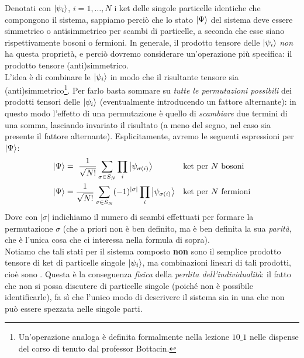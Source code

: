 \documentclass[../../FisicaTeorica.tex]{subfiles}
\begin{document}
Denotati con $\Ket{\psi_i}$, $i=1, \dots, N$ i ket delle singole particelle identiche che compongono il sistema, sappiamo perciò che lo stato  $\Ket{\Psi}$ del sistema deve essere simmetrico o antisimmetrico per scambi di particelle, a seconda che esse siano rispettivamente bosoni o fermioni. In generale, il prodotto tensore delle $\Ket{\psi_i}$ \textit{non} ha questa proprietà, e perciò dovremo considerare un'operazione più specifica: il prodotto tensore (anti)simmetrico.\\
L'idea è di combinare le $\Ket{\psi_i}$ in modo che il risultante tensore sia (anti)simmetrico\footnote{Un'operazione analoga è definita formalmente nella lezione $10\_1$ nelle dispense del corso di  tenuto dal professor Bottacin.}. Per farlo basta sommare su \textit{tutte le permutazioni possibili} dei prodotti tensori delle $\Ket{\psi_i}$ (eventualmente introducendo un fattore alternante): in questo modo l'effetto di una permutazione è quello di \textit{scambiare} due termini di una somma, lasciando invariato il risultato (a meno del segno, nel caso sia presente il fattore alternante). Esplicitamente, avremo le seguenti espressioni per $\Ket{\Psi}$:
\begin{align*}
\Ket{\Psi} &=\ \frac{1}{\sqrt{N!}}\sum_{\sigma \in S_N} \prod_i \Ket{\psi_{\sigma(i)}} && \text{ket per $N$ bosoni}\\
\Ket{\Psi} &= \frac{1}{\sqrt{N!}}\sum_{\sigma \in S_N} (-1)^{|\sigma|}\prod_i \Ket{\psi_{\sigma(i)}} && \text{ket per $N$ fermioni}
\end{align*}
Dove con $|\sigma|$ indichiamo il numero di scambi effettuati per formare la permutazione $\sigma$ (che a priori non è ben definito, ma è ben definita la sua \textit{parità}, che è l'unica cosa che ci interessa nella formula di sopra).\\
Notiamo che tali stati per il sistema composto \textbf{non} sono il semplice prodotto tensore di ket di particelle singole $\Ket{\psi_i}$, ma combinazioni lineari di tali prodotti, cioè sono . Questa è la conseguenza \textit{fisica} della \textit{perdita dell'individualità}: il fatto che non si possa discutere di particelle singole (poiché non è possibile identificarle), fa sì che l'unico modo di descrivere il sistema sia in una  che non può essere spezzata nelle singole parti.\\
\end{document}
